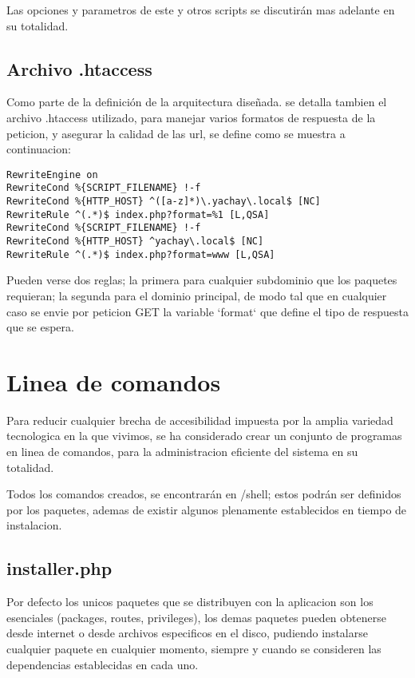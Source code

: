 Las opciones y parametros de este y otros scripts se discutirán mas adelante en su totalidad.

\subsection{Archivo .htaccess}
Como parte de la definición de la arquitectura diseñada. se detalla tambien el archivo .htaccess utilizado, para manejar 
varios formatos de respuesta de la peticion, y asegurar la calidad de las url, se define como se muestra a continuacion:

\begin{verbatim}
RewriteEngine on
RewriteCond %{SCRIPT_FILENAME} !-f
RewriteCond %{HTTP_HOST} ^([a-z]*)\.yachay\.local$ [NC]
RewriteRule ^(.*)$ index.php?format=%1 [L,QSA]
RewriteCond %{SCRIPT_FILENAME} !-f
RewriteCond %{HTTP_HOST} ^yachay\.local$ [NC]
RewriteRule ^(.*)$ index.php?format=www [L,QSA]
\end{verbatim}

Pueden verse dos reglas; la primera para cualquier subdominio que los paquetes requieran; la segunda para el dominio
principal, de modo tal que en cualquier caso se envie por peticion GET la variable `format` que define el tipo de
respuesta que se espera.

\section{Linea de comandos}
Para reducir cualquier brecha de accesibilidad impuesta por la amplia variedad tecnologica en la que vivimos, se ha
considerado crear un conjunto de programas en linea de comandos, para la administracion eficiente del sistema en su
totalidad.

Todos los comandos creados, se encontrarán en /shell; estos podrán ser definidos por los paquetes, ademas de existir
algunos plenamente establecidos en tiempo de instalacion.

\subsection{installer.php}
Por defecto los unicos paquetes que se distribuyen con la aplicacion son los esenciales (packages, routes, privileges),
los demas paquetes pueden obtenerse desde internet o desde archivos especificos en el disco, pudiendo instalarse
cualquier paquete en cualquier momento, siempre y cuando se consideren las dependencias establecidas en cada uno.

